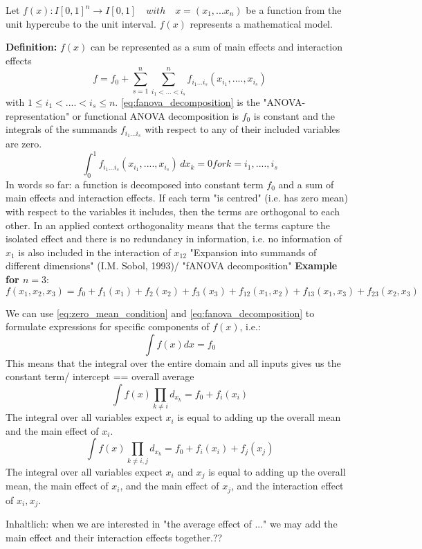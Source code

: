 Let $f(x): I[0,1]^n \rightarrow I[0,1] \quad with \quad x = (x_1, ... x_n) $ be a function from the unit hypercube to the unit interval. $f(x)$ represents a mathematical model.\par
\textbf{Definition:} $f(x)$ can be represented as a sum of main effects and interaction effects
\begin{equation}
    f = f_0 + \sum_{s=1}^{n} \sum_{i_1 <...<i_s}^{n} f_{i_{1}...i_{s}} (x_{i_{1}} , ....,x_{i_{s}})
    \label{eq:fanova_decomposition}
\end{equation}
with $1 \leq i_1 < .... < i_s \leq n$.
\autoref{eq:fanova_decomposition} is the "ANOVA-representation" \cite{sobol_global_2001} or functional ANOVA decomposition \cite{hooker_discovering_2004} is $f_0$ is constant and the integrals of the summands $f_{i_{1}...i_{s}}$ with respect to any of their included variables are zero.
\begin{equation}
    \int_{0}^{1} f_{i_{1}...i_{s}} (x_{i_{1}}, ...., x_{i_{s}}) \, dx_k = 0 for k = i_1, ...., i_s
    \label{eq:zero_mean_condition}
\end{equation}
In words so far: a function is decomposed into constant term $f_0$ and a sum of main effects and interaction effects. If each term "is centred" (i.e. has zero mean) with respect to the variables it includes, then the terms are orthogonal to each other. In an applied context orthogonality means that the terms capture the isolated effect and there is no redundancy in information, i.e. no information of $x_1$ is also included in the interaction of $x_12$
"Expansion into summands of different dimensions" (I.M. Sobol, 1993)/ "fANOVA decomposition"\citep{hooker_discovering_2004} 
\textbf{Example for $n=3$}:
\begin{equation}
    f(x_1,x_2,x_3) = f_0 + f_{1}(x_1) + f_{2}(x_2) + f_{3}(x_3) + f_{12}(x_1,x_2) + f_{13}(x_1,x_3) + f_{23}(x_2,x_3)
    \label{eq:fanova_decomposition_example}
\end{equation}

We can use \autoref{eq:zero_mean_condition} and \autoref{eq:fanova_decomposition} to formulate expressions for specific components of $f(x)$, i.e.:
\begin{equation}
    \int f(x) dx = f_0
\end{equation}
This means that the integral over the entire domain and all inputs gives us the constant term/ intercept == overall average
\begin{equation}
    \int f(x) \prod_{k \neq i} d_{x_{k}} = f_0 + f_i(x_i)
\end{equation}
The integral over all variables expect $x_i$ is equal to adding up the overall mean and the main effect of $x_i$.
\begin{equation}
    \int f(x) \prod_{k \neq i,j} d_{x_{k}} = f_0 + f_i(x_i) + f_j(x_j)
\end{equation}
The integral over all variables expect $x_i$ and $x_j$ is equal to adding up the overall mean, the main effect of $x_i$, and the main effect of $x_j$, and the interaction effect of $x_i, x_j$.\par
Inhaltlich: when we are interested in "the average effect of ..." we may add the main effect and their interaction effects together.??


